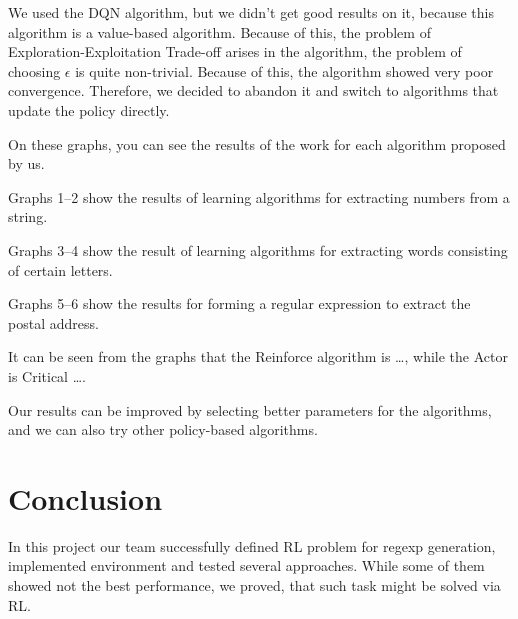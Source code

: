 \documentclass{article}
\begin{document}
We used the DQN algorithm, but we didn't get good results on it, because this algorithm is a value-based algorithm. Because of this, the problem of Exploration-Exploitation Trade-off arises in the algorithm, the problem of choosing $\epsilon$ is quite non-trivial. Because of this, the algorithm showed very poor convergence. Therefore, we decided to abandon it and switch to algorithms that update the policy directly.

On these graphs, you can see the results of the work for each algorithm proposed by us.

Graphs 1--2 show the results of learning algorithms for extracting numbers from a string.

Graphs 3--4 show the result of learning algorithms for extracting words consisting of certain letters.

Graphs 5--6 show the results for forming a regular expression to extract the postal address.

It can be seen from the graphs that the Reinforce algorithm is \ldots, while the Actor is Critical \ldots.

Our results can be improved by selecting better parameters for the algorithms, and we can also try other policy-based algorithms.



\section{Conclusion}

In this project our team successfully defined RL problem for regexp generation, implemented environment and tested several approaches. While some of them showed not the best performance, we proved, that such task might be solved via RL.






\end{document}
